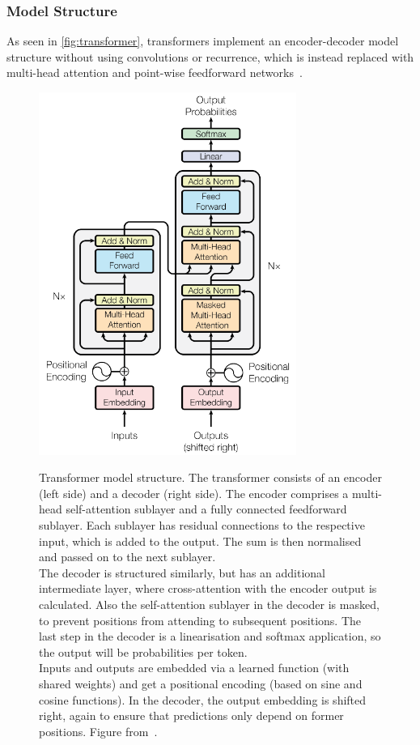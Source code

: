 \subsubsection{Model Structure}
As seen in \autoref{fig:transformer}, transformers implement an encoder-decoder model structure without using convolutions or recurrence, which is instead replaced with multi-head attention and point-wise feedforward networks~\autocite{Vaswani2017}.
\begin{figure}[p]
    \centering
    \includegraphics[width=0.75\textwidth]{pictures/transformer}\\
    \caption[Transformer Model Structure]{Transformer model structure. The transformer consists of an encoder (left side) and a decoder (right side). The encoder comprises a multi-head self-attention sublayer and a fully connected feedforward sublayer. Each sublayer has residual connections to the respective input, which is added to the output. The sum is then normalised and passed on to the next sublayer.\\The decoder is structured similarly, but has an additional intermediate layer, where cross-attention with the encoder output is calculated. Also the self-attention sublayer in the decoder is masked, to prevent positions from attending to subsequent positions. The last step in the decoder is a linearisation and softmax application, so the output will be probabilities per token.\\ Inputs and outputs are embedded via a learned function (with shared weights) and get a positional encoding (based on sine and cosine functions). In the decoder, the output embedding is shifted right, again to ensure that predictions only depend on former positions. Figure from~\autocite{Vaswani2017}.}
    \label{fig:transformer}
\end{figure}

